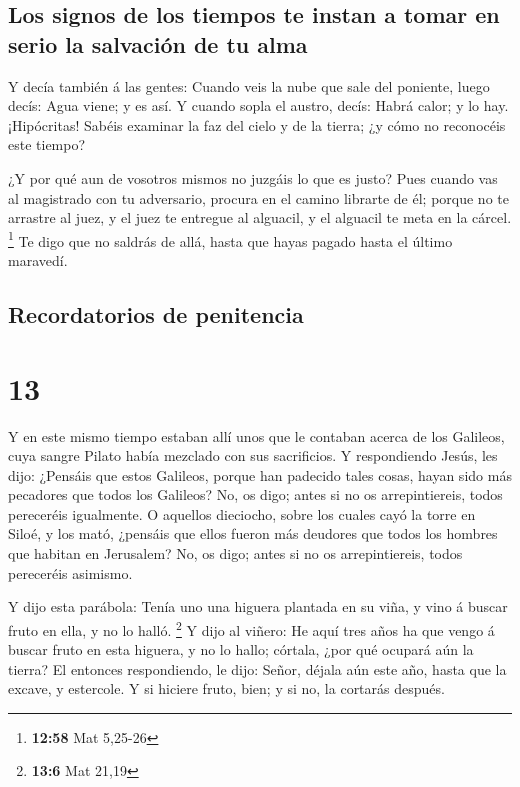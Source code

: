 \hypertarget{los-signos-de-los-tiempos-te-instan-a-tomar-en-serio-la-salvaciuxf3n-de-tu-alma}{%
\subsection{Los signos de los tiempos te instan a tomar en serio la
salvación de tu
alma}\label{los-signos-de-los-tiempos-te-instan-a-tomar-en-serio-la-salvaciuxf3n-de-tu-alma}}

 Y decía también á las gentes: Cuando veis la nube que sale
del poniente, luego decís: Agua viene; y es así.  Y cuando
sopla el austro, decís: Habrá calor; y lo hay. 
¡Hipócritas! Sabéis examinar la faz del cielo y de la tierra; ¿y cómo no
reconocéis este tiempo?

 ¿Y por qué aun de vosotros mismos no juzgáis lo que es
justo?  Pues cuando vas al magistrado con tu adversario,
procura en el camino librarte de él; porque no te arrastre al juez, y el
juez te entregue al alguacil, y el alguacil te meta en la cárcel.
\footnote{\textbf{12:58} Mat 5,25-26}  Te digo que no
saldrás de allá, hasta que hayas pagado hasta el último maravedí.

\hypertarget{recordatorios-de-penitencia}{%
\subsection{Recordatorios de
penitencia}\label{recordatorios-de-penitencia}}

\hypertarget{section-12}{%
\section{13}\label{section-12}}

 Y en este mismo tiempo estaban allí unos que le contaban
acerca de los Galileos, cuya sangre Pilato había mezclado con sus
sacrificios.  Y respondiendo Jesús, les dijo: ¿Pensáis que
estos Galileos, porque han padecido tales cosas, hayan sido más
pecadores que todos los Galileos?  No, os digo; antes si no
os arrepintiereis, todos pereceréis igualmente.  O aquellos
dieciocho, sobre los cuales cayó la torre en Siloé, y los mató, ¿pensáis
que ellos fueron más deudores que todos los hombres que habitan en
Jerusalem?  No, os digo; antes si no os arrepintiereis,
todos pereceréis asimismo.

 Y dijo esta parábola: Tenía uno una higuera plantada en su
viña, y vino á buscar fruto en ella, y no lo halló. \footnote{\textbf{13:6}
  Mat 21,19}  Y dijo al viñero: He aquí tres años ha que
vengo á buscar fruto en esta higuera, y no lo hallo; córtala, ¿por qué
ocupará aún la tierra?  El entonces respondiendo, le dijo:
Señor, déjala aún este año, hasta que la excave, y estercole.
 Y si hiciere fruto, bien; y si no, la cortarás después.

